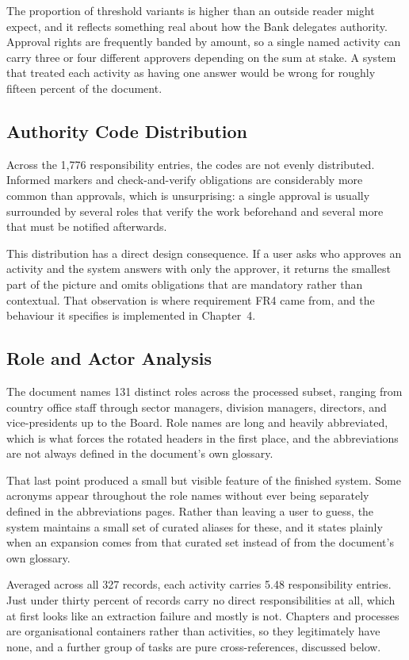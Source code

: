 The proportion of threshold variants is higher than an outside reader might expect, and it reflects something real about how the Bank delegates authority. Approval rights are frequently banded by amount, so a single named activity can carry three or four different approvers depending on the sum at stake. A system that treated each activity as having one answer would be wrong for roughly fifteen percent of the document.

\subsection{Authority Code Distribution}

Across the 1,776 responsibility entries, the codes are not evenly distributed. Informed markers and check-and-verify obligations are considerably more common than approvals, which is unsurprising: a single approval is usually surrounded by several roles that verify the work beforehand and several more that must be notified afterwards.

This distribution has a direct design consequence. If a user asks who approves an activity and the system answers with only the approver, it returns the smallest part of the picture and omits obligations that are mandatory rather than contextual. That observation is where requirement FR4 came from, and the behaviour it specifies is implemented in Chapter~4.

\subsection{Role and Actor Analysis}

The document names 131 distinct roles across the processed subset, ranging from country office staff through sector managers, division managers, directors, and vice-presidents up to the Board. Role names are long and heavily abbreviated, which is what forces the rotated headers in the first place, and the abbreviations are not always defined in the document's own glossary.

That last point produced a small but visible feature of the finished system. Some acronyms appear throughout the role names without ever being separately defined in the abbreviations pages. Rather than leaving a user to guess, the system maintains a small set of curated aliases for these, and it states plainly when an expansion comes from that curated set instead of from the document's own glossary.

Averaged across all 327 records, each activity carries 5.48 responsibility entries. Just under thirty percent of records carry no direct responsibilities at all, which at first looks like an extraction failure and mostly is not. Chapters and processes are organisational containers rather than activities, so they legitimately have none, and a further group of tasks are pure cross-references, discussed below.

